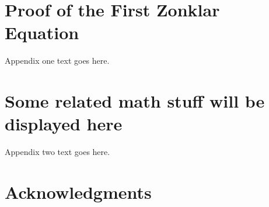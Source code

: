 \documentclass[12pt,journal,compsoc]{IEEEtran}
\begin{document}






%



\appendices
\section{Proof of the First Zonklar Equation}
Appendix one text goes here.

\section{Some related math stuff will be displayed here}
Appendix two text goes here.


\ifCLASSOPTIONcompsoc
  \section*{Acknowledgments}
\else
\end{document}
